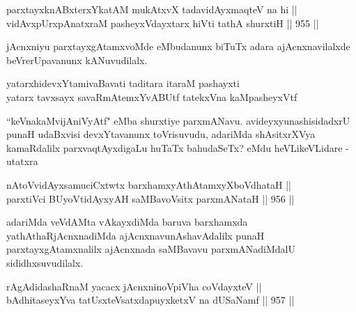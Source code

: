 \begin{shl}
parxtayxknABxterxYkatAM mukAtxvX tadavidAyxmaqteV na hi || \\
vidAvxpUrxpAnatxraM pasheyxVdayxtarx hiVti tathA shurxtiH ||  955 ||  
\end{shl}

\begin{artha}
jAcnxniyu parxtayxgAtamxvoMde eMbudanunx biTuTx adara ajAcnxnavilalxde beVrerUpavanunx kANuvudilalx.
\end{artha}
	
\begin{shl}
yatarxhidevxYtamivaBavati taditara itaraM pashayxti \\
yatarx tavxsayx savaRmAtemxYvABUtf tatekxVna kaMpasheyxVtf
\end{shl}	
	
\begin{artha}
``keVnakaMvijAniVyAtf" eMba shurxtiye parxmANavu. avideyxyunashisidadxrU punaH udaBxvisi devxYtavanunx toVrisuvudu, adariMda shAsitxrXVya kamaRdalilx parxvaqtAyxdigaLu huTaTx bahudaSeTx? eMdu heVLikeVLidare - utatxra
\end{artha}

\begin{shl}
nAtoV\s vidAyxsamuciCxtwtx barxhamxyAthAtamxyXboVdhataH || \\
parxtiVci BUyoV\s tidAyxyAH saMBavoV\s sitx parxmANataH ||  956 ||  
\end{shl}

\begin{artha}
adariMda veVdAMta vAkayxdiMda baruva barxhamxda yathAthaRjAcnxnadiMda ajAcnxnavunAshavAdalilx punaH parxtayxgAtamxnalilx ajAcnxnada saMBavavu parxmANadiMdalU sididhxsuvudilalx.
\end{artha}


\begin{shl}
rAgAdidashaRnaM yacacx jAcnxninoV\s piVha coVdayxteV || \\
\footnotemark[1]bAdhitaseyxYva tatUsxteVsatxdapuyxketxV na dUSaNamf ||  957 ||  
\end{shl}

